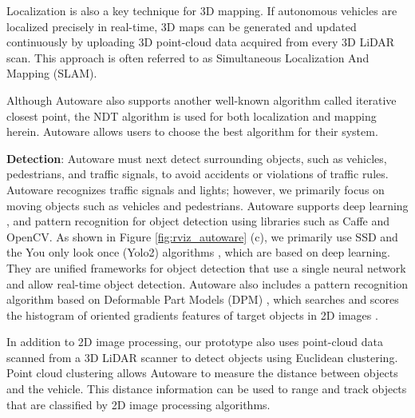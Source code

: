 Localization is also a key technique for 3D mapping.
If autonomous vehicles are localized precisely in real-time, 3D maps can
be generated and updated continuously by uploading 3D point-cloud
data acquired from every 3D LiDAR scan.
This approach is often referred to as Simultaneous Localization And
Mapping (SLAM).

Although Autoware also supports another well-known algorithm called iterative closest point,
the NDT algorithm is used for both localization and mapping herein.
Autoware allows users to choose the best algorithm
for their system.

  
\textbf{Detection}:
Autoware must next detect surrounding objects, such as
vehicles, pedestrians, and traffic signals, to avoid accidents or
violations of traffic rules.
Autoware recognizes traffic signals and lights; however, we primarily focus on moving objects such as vehicles and pedestrians.
Autoware supports deep learning \cite{liu2016ssd},
\cite{DBLP:journals/corr/RedmonF16} and pattern recognition
\cite{felzenszwalb2010object} for object detection
using libraries such as Caffe and OpenCV.
As shown in Figure \ref{fig:rviz_autoware} (c), we primarily use SSD \cite{liu2016ssd} and the You only look once (Yolo2) algorithms
\cite{DBLP:journals/corr/RedmonF16}, which are based on deep learning.
They are unified frameworks for object detection that use a single neural
network and allow real-time object detection.
Autoware also includes a pattern recognition algorithm based on Deformable
Part Models (DPM) \cite{felzenszwalb2010object}, which searches and scores the
histogram of oriented gradients features of target objects in 2D images \cite{dalal2005histograms}.

In addition to 2D image processing, our prototype also uses point-cloud data scanned from a
3D LiDAR scanner to detect objects using Euclidean clustering.
Point cloud clustering allows Autoware to measure the distance between objects and the vehicle.
This distance information can be used to range and track objects that are
classified by 2D image processing algorithms.

